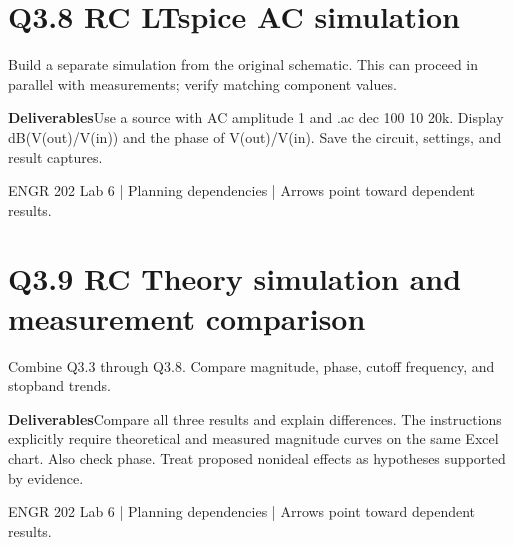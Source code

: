 \documentclass[11pt]{article}
\begin{document}
\section*{Q3.8 RC LTspice AC simulation}
Build a separate simulation from the original schematic. This can proceed in parallel with measurements; verify matching component values.\par\medskip
\textbf{Deliverables}\quad Use a source with AC amplitude 1 and .ac dec 100 10 20k. Display dB(V(out)/V(in)) and the phase of V(out)/V(in). Save the circuit, settings, and result captures.\par\bigskip
\begin{center}\end{center}
\vfill\small ENGR 202 Lab 6 | Planning dependencies | Arrows point toward dependent results.
\newpage
\section*{Q3.9 RC Theory simulation and measurement comparison}
Combine Q3.3 through Q3.8. Compare magnitude, phase, cutoff frequency, and stopband trends.\par\medskip
\textbf{Deliverables}\quad Compare all three results and explain differences. The instructions explicitly require theoretical and measured magnitude curves on the same Excel chart. Also check phase. Treat proposed nonideal effects as hypotheses supported by evidence.\par\bigskip
\begin{center}\end{center}
\vfill\small ENGR 202 Lab 6 | Planning dependencies | Arrows point toward dependent results.
\newpage
\end{document}
